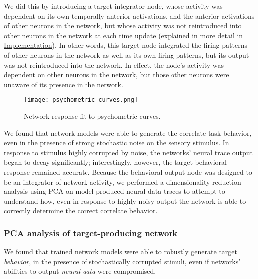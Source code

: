 \documentclass[12pt,a4paper,final]{iopart}
\begin{document}
We did this by introducing a target integrator node, whose activity was dependent on its own temporally anterior activations, and the anterior activations of other neurons in the network, but whose activity was not reintroduced into other neurons in the network at each time update (explained in more detail in \hyperref[sec:imp]{Implementation}). In other words, this target node integrated the firing patterns of other neurons in the network as well as its own firing patterns, but its output was not reintroduced into the network. In effect, the node's activity was dependent on other neurons in the network, but those other neurons were unaware of its presence in the network.
\begin{figure}
    \centering
    \texttt{[image: psychometric\_curves.png]}
    \caption{Network response fit to psychometric curves.}
    \label{fig:my_label}
\end{figure}

We found that network models were able to generate the correlate task behavior, even in the presence of strong stochastic noise on the sensory stimulus. In response to stimulus highly corrupted by noise, the networks' neural trace output began to decay significantly; interestingly, however, the target behavioral response remained accurate. Because the behavioral output node was designed to be an integrator of network activity, we performed a dimensionality-reduction analysis using PCA on model-produced neural data traces to attempt to understand how, even in response to highly noisy output the network is able to correctly determine the correct correlate behavior. 

\subsubsection{PCA analysis of target-producing network}
We found that trained network models were able to robustly generate target \emph{behavior}, in the presence of stochastically corrupted stimuli, even if networks' abilities to output \emph{neural data} were compromised.
\end{document}
